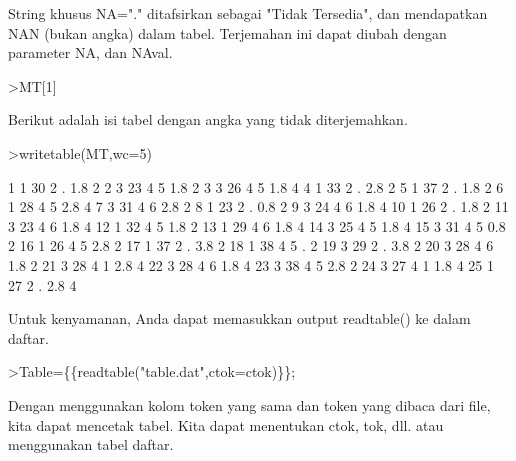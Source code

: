 \documentclass[a4paper,10pt]{article}
\begin{document}
\begin{eulernotebook}
\begin{eulercomment}
String khusus NA="." ditafsirkan sebagai "Tidak Tersedia", dan
mendapatkan NAN (bukan angka) dalam tabel. Terjemahan ini dapat diubah
dengan parameter NA, dan NAval.
\end{eulercomment}
\begin{eulerprompt}
>MT[1]
\end{eulerprompt}
\begin{euleroutput}
  [1,  1,  30,  2,  NAN,  1.8,  2]
\end{euleroutput}
\begin{eulercomment}
Berikut adalah isi tabel dengan angka yang tidak diterjemahkan.
\end{eulercomment}
\begin{eulerprompt}
>writetable(MT,wc=5)
\end{eulerprompt}
\begin{euleroutput}
      1    1   30    2    .  1.8    2
      2    3   23    4    5  1.8    2
      3    3   26    4    5  1.8    4
      4    1   33    2    .  2.8    2
      5    1   37    2    .  1.8    2
      6    1   28    4    5  2.8    4
      7    3   31    4    6  2.8    2
      8    1   23    2    .  0.8    2
      9    3   24    4    6  1.8    4
     10    1   26    2    .  1.8    2
     11    3   23    4    6  1.8    4
     12    1   32    4    5  1.8    2
     13    1   29    4    6  1.8    4
     14    3   25    4    5  1.8    4
     15    3   31    4    5  0.8    2
     16    1   26    4    5  2.8    2
     17    1   37    2    .  3.8    2
     18    1   38    4    5    .    2
     19    3   29    2    .  3.8    2
     20    3   28    4    6  1.8    2
     21    3   28    4    1  2.8    4
     22    3   28    4    6  1.8    4
     23    3   38    4    5  2.8    2
     24    3   27    4    1  1.8    4
     25    1   27    2    .  2.8    4
\end{euleroutput}
\begin{eulercomment}
Untuk kenyamanan, Anda dapat memasukkan output readtable() ke dalam
daftar.
\end{eulercomment}
\begin{eulerprompt}
>Table=\{\{readtable("table.dat",ctok=ctok)\}\};
\end{eulerprompt}
\begin{eulercomment}
Dengan menggunakan kolom token yang sama dan token yang dibaca dari
file, kita dapat mencetak tabel. Kita dapat menentukan ctok, tok, dll.
atau menggunakan tabel daftar.
\end{eulercomment}
\begin{eulerprompt}

\end{eulerprompt}
\end{eulernotebook}
\end{document}
